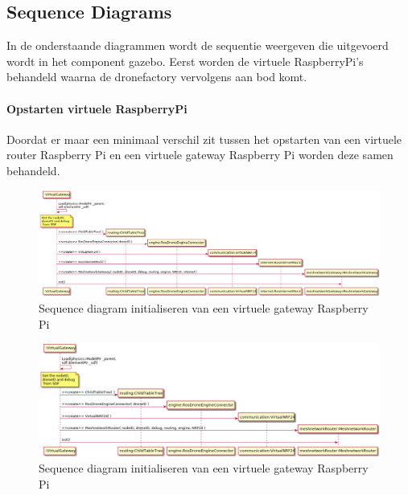 \documentclass[a4paper, 11pt, oneside]{report}
\begin{document}
\subsection{Sequence Diagrams}
\label{DetailedDesign:MeshNetwerk:sequence}
In de onderstaande diagrammen wordt de sequentie weergeven die uitgevoerd wordt in het component gazebo. 
Eerst worden de virtuele RaspberryPi's behandeld waarna de dronefactory vervolgens aan bod komt. 

\paragraph{Opstarten virtuele RaspberryPi}
\label{DetailedDesign:MeshNetwerk:sequence:startenRaspberryPi}
Doordat er maar een minimaal verschil zit tussen het opstarten van een virtuele router Raspberry Pi en een virtuele gateway Raspberry Pi worden deze samen behandeld.


\begin{figure}[H]
	\begin{center}\includegraphics[width=.90\linewidth]{UML/out/DroneSimulation/Sequence/VirtualGateway/VirtualGateway.png}\end{center}
	\caption{Sequence diagram initialiseren van een virtuele gateway Raspberry Pi}
	\label{fig:communication:MeshNetwerk:sequence:gatewayRaspberryPi}
\end{figure}

\begin{figure}[H]
	\begin{center}\includegraphics[width=.90\linewidth]{UML/out/DroneSimulation/Sequence/VirtualRouter/VirtualRouter.png}\end{center}
	\caption{Sequence diagram initialiseren van een virtuele gateway Raspberry Pi}
	\label{fig:communication:MeshNetwerk:sequence:routerRaspberryPi}
\end{figure}
\end{document}

